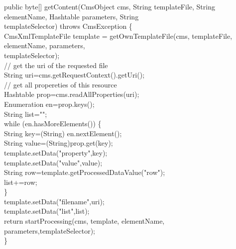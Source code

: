\begin{java}
public byte[] getContent(CmsObject cms, String templateFile, String\\
\jtaba   elementName, Hashtable parameters, String\\
\jtaba   templateSelector) throws CmsException \{\\

CmsXmlTemplateFile template = getOwnTemplateFile(cms, templateFile,\\
\jtabe                              elementName, parameters,\\
\jtaba   templateSelector);\\

\jtaba        // get the uri of the requested file\\
\jtaba        String uri=cms.getRequestContext().getUri();\\

\jtaba        // get all propereties of this resource\\
\jtaba        Hashtable prop=cms.readAllProperties(uri);\\

\jtaba        Enumeration en=prop.keys();\\

\jtaba        String list="";\\

\jtaba        while (en.hasMoreElements()) \{\\
\jtabc            String key=(String) en.nextElement();\\
\jtabc            String value=(String)prop.get(key);\\

\jtabc            template.setData("property",key);\\
\jtabc            template.setData("value",value);\\
\jtabb         String row=template.getProcessedDataValue("row");\\
\jtabc            list+=row;\\

\jtaba        \}\\


\jtaba        template.setData("filename",uri);\\
\jtaba        template.setData("list",list);\\

\jtaba        return startProcessing(cms, template, elementName, parameters,templateSelector);\\
\}\\
\end{java}

